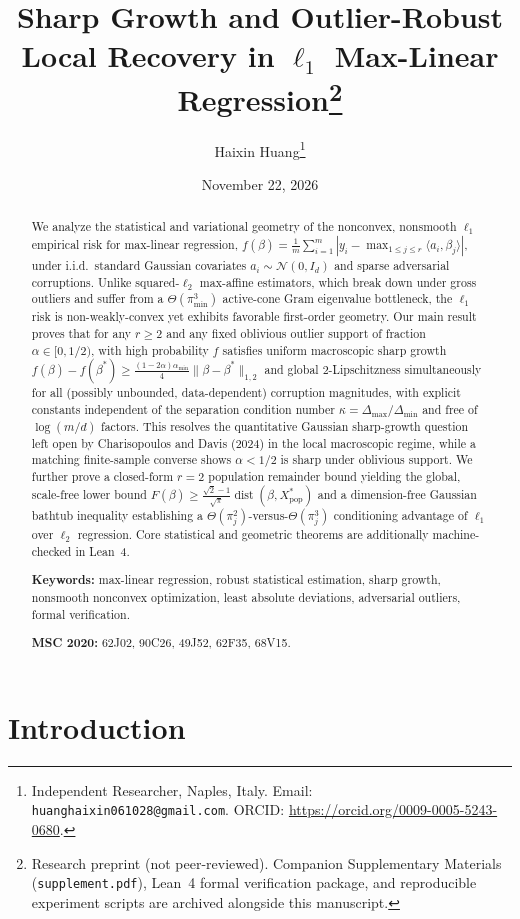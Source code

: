 \documentclass[11pt]{article}
\title{\bfseries Sharp Growth and Outlier-Robust Local Recovery in $\ell_1$ Max-Linear Regression\thanks{Research preprint (not peer-reviewed). Companion Supplementary Materials (\texttt{supplement.pdf}), Lean~4 formal verification package, and reproducible experiment scripts are archived alongside this manuscript.}}
\author{Haixin Huang\thanks{Independent Researcher, Naples, Italy. Email: \texttt{huanghaixin061028@gmail.com}. ORCID: \url{https://orcid.org/0009-0005-5243-0680}.}}
\date{November 22, 2026}
\theoremstyle{plain}
\theoremstyle{remark}
\numberwithin{equation}{section}
\newcommand{\ip}[2]{\langle #1, #2 \rangle}
\newcommand{\dist}{\operatorname{dist}}
\newcommand{\Lonenorm}[1]{\|#1\|_{1,2}}
\begin{document}
\maketitle

\begin{abstract}
We analyze the statistical and variational geometry of the nonconvex, nonsmooth $\ell_1$ empirical risk for max-linear regression, $f(\beta) = \frac{1}{m}\sum_{i=1}^m |y_i - \max_{1 \le j \le r} \ip{a_i}{\beta_j}|$, under i.i.d.\ standard Gaussian covariates $a_i \sim \mathcal{N}(0, I_d)$ and sparse adversarial corruptions. Unlike squared-$\ell_2$ max-affine estimators, which break down under gross outliers and suffer from a $\Theta(\pi_{\min}^3)$ active-cone Gram eigenvalue bottleneck, the $\ell_1$ risk is non-weakly-convex yet exhibits favorable first-order geometry. Our main result proves that for any $r \ge 2$ and any fixed oblivious outlier support of fraction $\alpha \in [0, 1/2)$, with high probability $f$ satisfies uniform macroscopic sharp growth $f(\beta) - f(\beta^*) \ge \frac{(1-2\alpha)\alpha_{\min}}{4}\Lonenorm{\beta - \beta^*}$ and global $2$-Lipschitzness simultaneously for all (possibly unbounded, data-dependent) corruption magnitudes, with explicit constants independent of the separation condition number $\kappa = \Delta_{\max}/\Delta_{\min}$ and free of $\log(m/d)$ factors. This resolves the quantitative Gaussian sharp-growth question left open by Charisopoulos and Davis (2024) in the local macroscopic regime, while a matching finite-sample converse shows $\alpha < 1/2$ is sharp under oblivious support. We further prove a closed-form $r = 2$ population remainder bound yielding the global, scale-free lower bound $F(\beta) \ge \frac{\sqrt{2}-1}{\sqrt{\pi}}\dist(\beta, X_{\mathrm{pop}}^*)$ and a dimension-free Gaussian bathtub inequality establishing a $\Theta(\pi_j^2)$-versus-$\Theta(\pi_j^3)$ conditioning advantage of $\ell_1$ over $\ell_2$ regression. Core statistical and geometric theorems are additionally machine-checked in Lean~4.

\medskip
\noindent\textbf{Keywords:} max-linear regression, robust statistical estimation, sharp growth, nonsmooth nonconvex optimization, least absolute deviations, adversarial outliers, formal verification.

\smallskip
\noindent\textbf{MSC 2020:} 62J02, 90C26, 49J52, 62F35, 68V15.
\end{abstract}

\section{Introduction}
\label{sec:intro}
\end{document}
